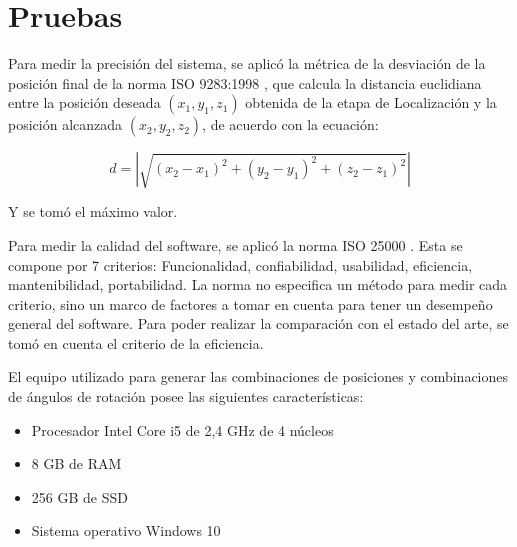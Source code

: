 \section{Pruebas}

Para medir la precisión del sistema, se aplicó la métrica de la desviación de la posición final de la norma ISO 9283:1998 \cite{ISO9283}, que calcula la distancia euclidiana entre la posición deseada $(x_1, y_1, z_1)$ obtenida de la etapa de Localización y la posición alcanzada $(x_2, y_2, z_2)$, de acuerdo con la ecuación:

\begin{equation}
	d = |\sqrt{(x_2 - x_1)^2 + (y_2 - y_1)^2 + (z_2 - z_1)^2}|
\end{equation}

Y se tomó el máximo valor.

Para medir la calidad del software, se aplicó la norma ISO 25000 \cite{ISO25000}. Esta se compone por 7 criterios: Funcionalidad, confiabilidad, usabilidad, eficiencia, mantenibilidad, portabilidad. La norma no especifica un método para medir cada criterio, sino un marco de factores a tomar en cuenta para tener un desempeño general del software. Para poder realizar la comparación con el estado del arte, se tomó en cuenta el criterio de la eficiencia.

El equipo utilizado para generar las combinaciones de posiciones y combinaciones de ángulos de rotación posee las siguientes características:

\begin{itemize}
	\item Procesador Intel Core i5 de 2,4 GHz de 4 núcleos
	\item 8 GB de RAM
	\item 256 GB de SSD
	\item Sistema operativo Windows 10
\end{itemize}